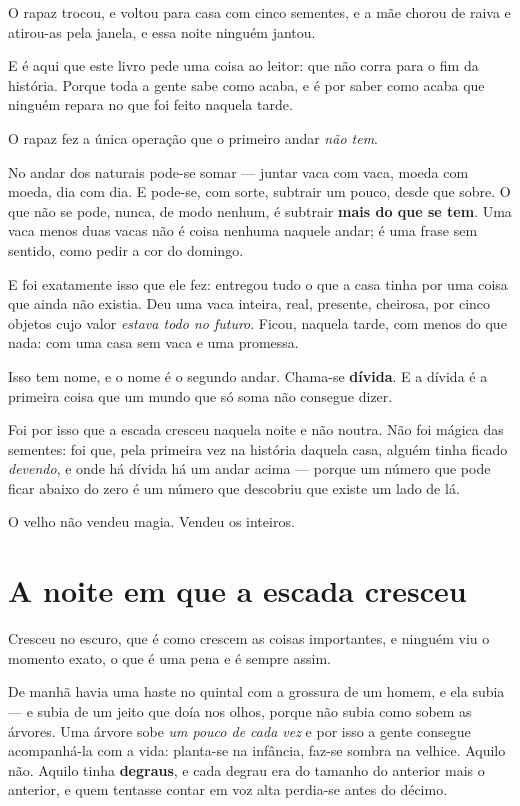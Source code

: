 \documentclass[livro.tex]{subfiles}
\begin{document}
\medskip

O rapaz trocou, e voltou para casa com cinco sementes, e a mãe chorou de raiva e atirou-as
pela janela, e essa noite ninguém jantou.

E é aqui que este livro pede uma coisa ao leitor: que não corra para o fim da história.
Porque toda a gente sabe como acaba, e é por saber como acaba que ninguém repara no que
foi feito naquela tarde.

\medskip

O rapaz fez a única operação que o primeiro andar \emph{não tem}.

No andar dos naturais pode-se somar --- juntar vaca com vaca, moeda com moeda, dia com dia. E
pode-se, com sorte, subtrair um pouco, desde que sobre. O que não se pode, nunca, de modo
nenhum, é subtrair \textbf{mais do que se tem}. Uma vaca menos duas vacas não é coisa
nenhuma naquele andar; é uma frase sem sentido, como pedir a cor do domingo.

E foi exatamente isso que ele fez: entregou tudo o que a casa tinha por uma coisa que
ainda não existia. Deu uma vaca inteira, real, presente, cheirosa, por cinco objetos cujo
valor \emph{estava todo no futuro}. Ficou, naquela tarde, com menos do que nada: com uma
casa sem vaca e uma promessa.

Isso tem nome, e o nome é o segundo andar. Chama-se \textbf{dívida}. E a dívida é a
primeira coisa que um mundo que só soma não consegue dizer.

\medskip

Foi por isso que a escada cresceu naquela noite e não noutra. Não foi mágica das
sementes: foi que, pela primeira vez na história daquela casa, alguém tinha ficado
\emph{devendo}, e onde há dívida há um andar acima --- porque um número que pode ficar
abaixo do zero é um número que descobriu que existe um lado de lá.

O velho não vendeu magia. Vendeu os inteiros.

\section{A noite em que a escada cresceu}

Cresceu no escuro, que é como crescem as coisas importantes, e ninguém viu o momento
exato, o que é uma pena e é sempre assim.

De manhã havia uma haste no quintal com a grossura de um homem, e ela subia --- e subia
de um jeito que doía nos olhos, porque não subia como sobem as árvores. Uma árvore sobe
\emph{um pouco de cada vez} e por isso a gente consegue acompanhá-la com a vida: planta-se
na infância, faz-se sombra na velhice. Aquilo não. Aquilo tinha \textbf{degraus}, e cada
degrau era do tamanho do anterior mais o anterior, e quem tentasse contar em voz alta
perdia-se antes do décimo.
\end{document}
